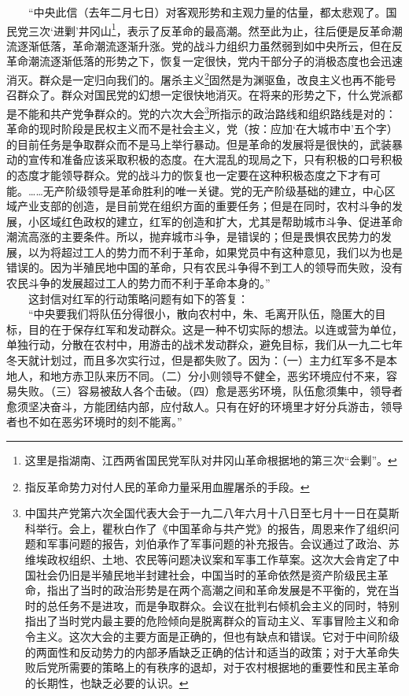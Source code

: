\documentclass[cn,11pt,chinese]{elegantbook}
\begin{document}
　　“中央此信（去年二月七日）对客观形势和主观力量的估量，都太悲观了。国民党三次‘进剿’井冈山\footnote[9]{ 这里是指湖南、江西两省国民党军队对井冈山革命根据地的第三次“会剿”。}，表示了反革命的最高潮。然至此为止，往后便是反革命潮流逐渐低落，革命潮流逐渐升涨。党的战斗力组织力虽然弱到如中央所云，但在反革命潮流逐渐低落的形势之下，恢复一定很快，党内干部分子的消极态度也会迅速消灭。群众是一定归向我们的。屠杀主义\footnote[10]{ 指反革命势力对付人民的革命力量采用血腥屠杀的手段。}固然是为渊驱鱼，改良主义也再不能号召群众了。群众对国民党的幻想一定很快地消灭。在将来的形势之下，什么党派都是不能和共产党争群众的。党的六次大会\footnote[11]{ 中国共产党第六次全国代表大会于一九二八年六月十八日至七月十一日在莫斯科举行。会上，瞿秋白作了《中国革命与共产党》的报告，周恩来作了组织问题和军事问题的报告，刘伯承作了军事问题的补充报告。会议通过了政治、苏维埃政权组织、土地、农民等问题决议案和军事工作草案。这次大会肯定了中国社会仍旧是半殖民地半封建社会，中国当时的革命依然是资产阶级民主革命，指出了当时的政治形势是在两个高潮之间和革命发展是不平衡的，党在当时的总任务不是进攻，而是争取群众。会议在批判右倾机会主义的同时，特别指出了当时党内最主要的危险倾向是脱离群众的盲动主义、军事冒险主义和命令主义。这次大会的主要方面是正确的，但也有缺点和错误。它对于中间阶级的两面性和反动势力的内部矛盾缺乏正确的估计和适当的政策；对于大革命失败后党所需要的策略上的有秩序的退却，对于农村根据地的重要性和民主革命的长期性，也缺乏必要的认识。}所指示的政治路线和组织路线是对的：革命的现时阶段是民权主义而不是社会主义，党（按：应加‘在大城市中’五个字）的目前任务是争取群众而不是马上举行暴动。但是革命的发展将是很快的，武装暴动的宣传和准备应该采取积极的态度。在大混乱的现局之下，只有积极的口号积极的态度才能领导群众。党的战斗力的恢复也一定要在这种积极态度之下才有可能。……无产阶级领导是革命胜利的唯一关键。党的无产阶级基础的建立，中心区域产业支部的创造，是目前党在组织方面的重要任务；但是在同时，农村斗争的发展，小区域红色政权的建立，红军的创造和扩大，尤其是帮助城市斗争、促进革命潮流高涨的主要条件。所以，抛弃城市斗争，是错误的；但是畏惧农民势力的发展，以为将超过工人的势力而不利于革命，如果党员中有这种意见，我们以为也是错误的。因为半殖民地中国的革命，只有农民斗争得不到工人的领导而失败，没有农民斗争的发展超过工人的势力而不利于革命本身的。”\\
　　这封信对红军的行动策略问题有如下的答复：\\
　　“中央要我们将队伍分得很小，散向农村中，朱、毛离开队伍，隐匿大的目标，目的在于保存红军和发动群众。这是一种不切实际的想法。以连或营为单位，单独行动，分散在农村中，用游击的战术发动群众，避免目标，我们从一九二七年冬天就计划过，而且多次实行过，但是都失败了。因为：（一）主力红军多不是本地人，和地方赤卫队来历不同。（二）分小则领导不健全，恶劣环境应付不来，容易失败。（三）容易被敌人各个击破。（四）愈是恶劣环境，队伍愈须集中，领导者愈须坚决奋斗，方能团结内部，应付敌人。只有在好的环境里才好分兵游击，领导者也不如在恶劣环境时的刻不能离。”\\
\end{document}

